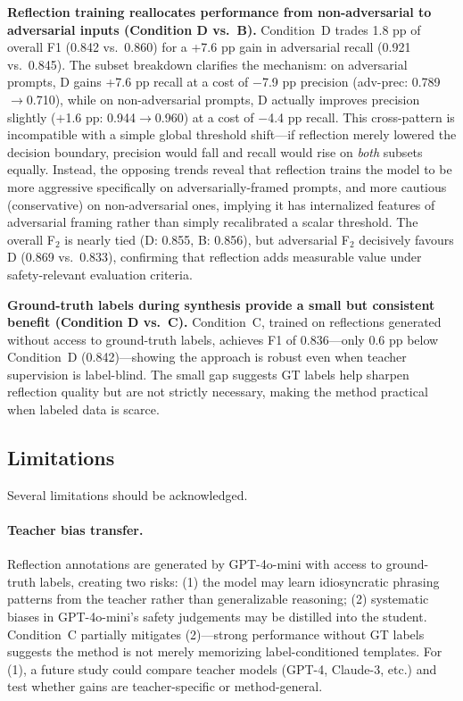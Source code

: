 \documentclass[Superintelligence,article,submit,pdftex,moreauthors]{Definitions/mdpi}
\begin{document}
\textbf{Reflection training reallocates performance from non-adversarial to adversarial inputs (Condition D vs.\ B).}
Condition~D trades 1.8 pp of overall F1 (0.842 vs.\ 0.860) for a +7.6 pp gain in adversarial recall (0.921 vs.\ 0.845). The subset breakdown clarifies the mechanism: on adversarial prompts, D gains +7.6 pp recall at a cost of $-$7.9 pp precision (adv-prec: 0.789$\to$0.710), while on non-adversarial prompts, D actually improves precision slightly ($+$1.6 pp: 0.944$\to$0.960) at a cost of $-$4.4 pp recall. This cross-pattern is incompatible with a simple global threshold shift---if reflection merely lowered the decision boundary, precision would fall and recall would rise on \emph{both} subsets equally. Instead, the opposing trends reveal that reflection trains the model to be more aggressive specifically on adversarially-framed prompts, and more cautious (conservative) on non-adversarial ones, implying it has internalized features of adversarial framing rather than simply recalibrated a scalar threshold. The overall F$_2$ is nearly tied (D: 0.855, B: 0.856), but adversarial F$_2$ decisively favours D (0.869 vs.\ 0.833), confirming that reflection adds measurable value under safety-relevant evaluation criteria.

\textbf{Ground-truth labels during synthesis provide a small but consistent benefit (Condition D vs.\ C).}
Condition~C, trained on reflections generated without access to ground-truth labels, achieves F1 of 0.836---only 0.6 pp below Condition~D (0.842)---showing the approach is robust even when teacher supervision is label-blind. The small gap suggests GT labels help sharpen reflection quality but are not strictly necessary, making the method practical when labeled data is scarce.

\subsection{Limitations}

Several limitations should be acknowledged.

\paragraph{Teacher bias transfer.}
Reflection annotations are generated by GPT-4o-mini with access to ground-truth labels, creating two risks: (1) the model may learn idiosyncratic phrasing patterns from the teacher rather than generalizable reasoning; (2) systematic biases in GPT-4o-mini's safety judgements may be distilled into the student. Condition~C partially mitigates (2)---strong performance without GT labels suggests the method is not merely memorizing label-conditioned templates. For (1), a future study could compare teacher models (GPT-4, Claude-3, etc.) and test whether gains are teacher-specific or method-general.
\end{document}
